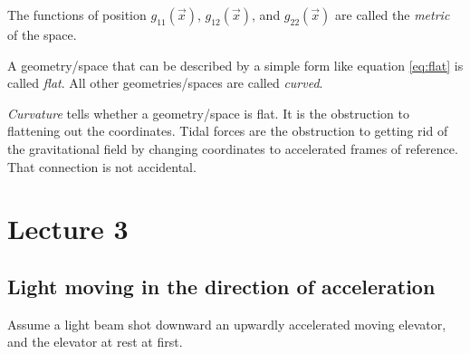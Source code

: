 \documentclass[pagesize,headsepline,10pt,parskip=half,BCOR=12mm]{scrreprt}
\begin{document}
      The functions of position $g_{11}(\vec x)$, $g_{12}(\vec x)$,
      and $g_{22}(\vec x)$ are called the \emph{metric} of the
      space.

      A geometry/space that can be described by a simple form
      like equation \ref{eq:flat} is called \emph{flat}.
      All other geometries/spaces are called \emph{curved}.

      \emph{Curvature} tells whether a geometry/space is flat.  It
      is the obstruction to flattening out the coordinates.  Tidal forces
      are the obstruction to getting rid of the gravitational field
      by changing coordinates to accelerated frames of reference.
      That connection is not accidental.

  \chapter{Lecture 3}
    \section{Light moving in the direction of acceleration}
      Assume a light beam shot downward an upwardly accelerated
      moving elevator, and the elevator at rest at first.
\end{document}
